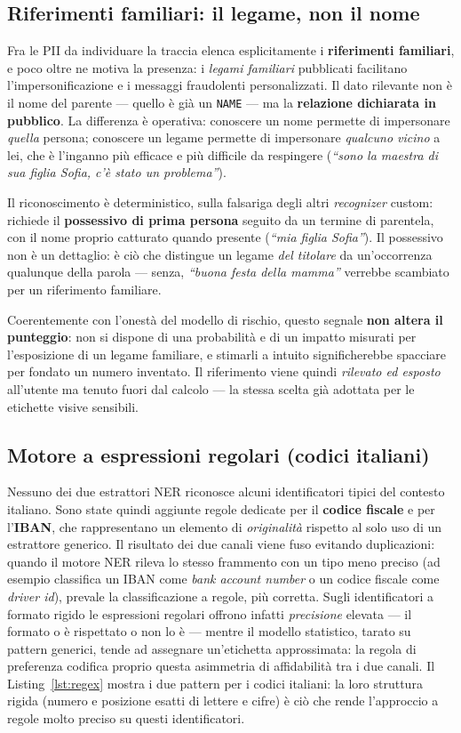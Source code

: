 \documentclass[11pt,a4paper]{article}
\begin{document}
\subsection{Riferimenti familiari: il legame, non il nome}
Fra le PII da individuare la traccia elenca esplicitamente i \textbf{riferimenti
familiari}, e poco oltre ne motiva la presenza: i \emph{legami familiari} pubblicati
facilitano l'impersonificazione e i messaggi fraudolenti personalizzati. Il dato
rilevante non è il nome del parente --- quello è già un \texttt{NAME} --- ma la
\textbf{relazione dichiarata in pubblico}. La differenza è operativa: conoscere un nome
permette di impersonare \emph{quella} persona; conoscere un legame permette di
impersonare \emph{qualcuno vicino} a lei, che è l'inganno più efficace e più difficile da
respingere (\emph{``sono la maestra di sua figlia Sofia, c'è stato un problema''}).

Il riconoscimento è deterministico, sulla falsariga degli altri \emph{recognizer} custom:
richiede il \textbf{possessivo di prima persona} seguito da un termine di parentela, con
il nome proprio catturato quando presente (\emph{``mia figlia Sofia''}). Il possessivo non
è un dettaglio: è ciò che distingue un legame \emph{del titolare} da un'occorrenza
qualunque della parola --- senza, \emph{``buona festa della mamma''} verrebbe scambiato per
un riferimento familiare.

Coerentemente con l'onestà del modello di rischio, questo segnale \textbf{non altera il
punteggio}: non si dispone di una probabilità e di un impatto misurati per l'esposizione
di un legame familiare, e stimarli a intuito significherebbe spacciare per fondato un
numero inventato. Il riferimento viene quindi \emph{rilevato ed esposto} all'utente ma
tenuto fuori dal calcolo --- la stessa scelta già adottata per le etichette visive
sensibili.

\subsection{Motore a espressioni regolari (codici italiani)} Nessuno dei due estrattori NER riconosce
alcuni identificatori tipici del contesto italiano. Sono state quindi aggiunte regole
dedicate per il \textbf{codice fiscale} e per l'\textbf{IBAN}, che rappresentano un
elemento di \emph{originalità} rispetto al solo uso di un estrattore generico. Il risultato
dei due canali viene fuso evitando duplicazioni: quando il motore NER rileva lo stesso
frammento con un tipo meno preciso (ad esempio classifica un IBAN come
\emph{bank account number} o un codice fiscale come \emph{driver id}), prevale la
classificazione a regole, più corretta. Sugli identificatori a formato rigido le
espressioni regolari offrono infatti \emph{precisione} elevata --- il formato o è
rispettato o non lo è --- mentre il modello statistico, tarato su pattern generici,
tende ad assegnare un'etichetta approssimata: la regola di preferenza codifica proprio
questa asimmetria di affidabilità tra i due canali. Il Listing~\ref{lst:regex} mostra i
due pattern per i codici italiani: la loro struttura rigida (numero e posizione esatti di
lettere e cifre) è ciò che rende l'approccio a regole molto preciso su questi
identificatori.
\end{document}
